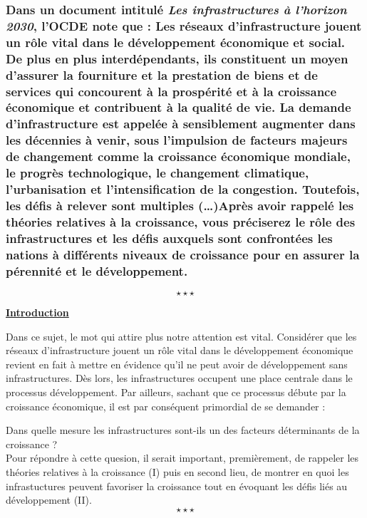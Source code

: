 \newpage %
	\subsubsection*{Dans un document intitulé \guillemetleft \textit{Les infrastructures à l’horizon 2030}\guillemetright,  l’OCDE note que : \newline \guillemetleft Les réseaux d’infrastructure jouent un rôle vital dans le développement économique et social. De plus en plus interdépendants, ils constituent un moyen d’assurer la fourniture et la prestation de biens et de services qui concourent à la prospérité et à la croissance économique et contribuent à la qualité de vie. La demande d’infrastructure est appelée à sensiblement augmenter dans les décennies à venir, sous l’impulsion de facteurs majeurs de changement comme la croissance économique mondiale, le progrès technologique, le changement climatique, l’urbanisation et l’intensification de la congestion. Toutefois, les défis à relever sont multiples (…)\guillemetright \newline \newline Après avoir rappelé les théories relatives à la croissance, vous préciserez le rôle des infrastructures et les défis auxquels sont confrontées les nations à différents niveaux de croissance pour en assurer la pérennité et le développement. }
$$\star \star \star$$

\begin{center}
	\textbf{\underline{Introduction}} 
\end{center}

Dans ce sujet, le mot qui attire plus notre attention est \guillemetleft vital\guillemetright. Considérer que les réseaux d'infrastructure jouent un rôle vital dans le développement économique revient en fait à mettre en évidence qu'il ne peut avoir de développement sans infrastructures. Dès lors, les infrastructures occupent une place centrale dans le processus développement. Par ailleurs, sachant que ce processus débute par la croissance économique, il est par conséquent primordial de se demander :

Dans quelle mesure les infrastructures sont-ils un des facteurs déterminants de la croissance ?\\

Pour répondre à cette quesion, il serait important, premièrement, de rappeler les théories relatives à la croissance (I) puis en second lieu, de montrer en quoi les infrastuctures peuvent favoriser la croissance tout en évoquant les défis liés au développement (II). $$\star \star \star$$

